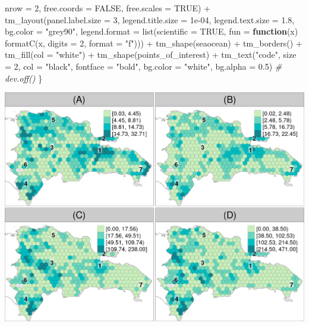 \documentclass[10pt,landscape,a3paper]{article}
\newenvironment{Shaded}{\begin{snugshade}}{\end{snugshade}}
\newcommand{\AttributeTok}[1]{\textcolor[rgb]{0.77,0.63,0.00}{#1}}
\newcommand{\CommentTok}[1]{\textcolor[rgb]{0.56,0.35,0.01}{\textit{#1}}}
\newcommand{\ConstantTok}[1]{\textcolor[rgb]{0.00,0.00,0.00}{#1}}
\newcommand{\ControlFlowTok}[1]{\textcolor[rgb]{0.13,0.29,0.53}{\textbf{#1}}}
\newcommand{\DecValTok}[1]{\textcolor[rgb]{0.00,0.00,0.81}{#1}}
\newcommand{\FloatTok}[1]{\textcolor[rgb]{0.00,0.00,0.81}{#1}}
\newcommand{\FunctionTok}[1]{\textcolor[rgb]{0.00,0.00,0.00}{#1}}
\newcommand{\NormalTok}[1]{#1}
\newcommand{\SpecialCharTok}[1]{\textcolor[rgb]{0.00,0.00,0.00}{#1}}
\newcommand{\StringTok}[1]{\textcolor[rgb]{0.31,0.60,0.02}{#1}}
\begin{document}
\begin{Shaded}
\begin{Highlighting}[]
        \AttributeTok{nrow =} \DecValTok{2}\NormalTok{, }\AttributeTok{free.coords =} \ConstantTok{FALSE}\NormalTok{, }\AttributeTok{free.scales =} \ConstantTok{TRUE}\NormalTok{) }\SpecialCharTok{+} \FunctionTok{tm\_layout}\NormalTok{(}\AttributeTok{panel.label.size =} \DecValTok{3}\NormalTok{,}
        \AttributeTok{legend.title.size =} \FloatTok{1e{-}04}\NormalTok{, }\AttributeTok{legend.text.size =} \FloatTok{1.8}\NormalTok{, }\AttributeTok{bg.color =} \StringTok{"grey90"}\NormalTok{, }\AttributeTok{legend.format =} \FunctionTok{list}\NormalTok{(}\AttributeTok{scientific =} \ConstantTok{TRUE}\NormalTok{,}
            \AttributeTok{fun =} \ControlFlowTok{function}\NormalTok{(x) }\FunctionTok{formatC}\NormalTok{(x, }\AttributeTok{digits =} \DecValTok{2}\NormalTok{, }\AttributeTok{format =} \StringTok{"f"}\NormalTok{))) }\SpecialCharTok{+} \FunctionTok{tm\_shape}\NormalTok{(seaocean) }\SpecialCharTok{+}
        \FunctionTok{tm\_borders}\NormalTok{() }\SpecialCharTok{+} \FunctionTok{tm\_fill}\NormalTok{(}\AttributeTok{col =} \StringTok{"white"}\NormalTok{) }\SpecialCharTok{+} \FunctionTok{tm\_shape}\NormalTok{(points\_of\_interest) }\SpecialCharTok{+} \FunctionTok{tm\_text}\NormalTok{(}\StringTok{"code"}\NormalTok{,}
        \AttributeTok{size =} \DecValTok{2}\NormalTok{, }\AttributeTok{col =} \StringTok{"black"}\NormalTok{, }\AttributeTok{fontface =} \StringTok{"bold"}\NormalTok{, }\AttributeTok{bg.color =} \StringTok{"white"}\NormalTok{, }\AttributeTok{bg.alpha =} \FloatTok{0.5}\NormalTok{)}
    \CommentTok{\# dev.off()}
\NormalTok{\}}
\end{Highlighting}
\end{Shaded}

\begin{center}\includegraphics{img/modelling/lta-esda-18} \end{center}
\end{document}
